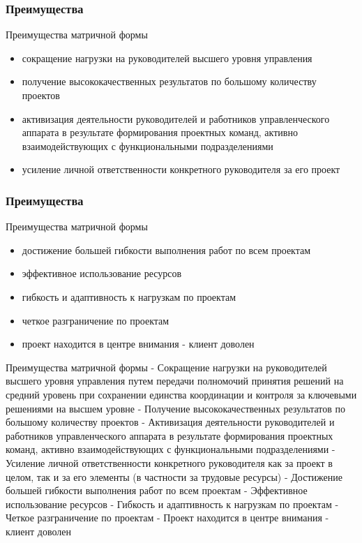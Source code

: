 \documentclass{industrial-development}
\begin{document}
\begin{frame} \frametitle{Преимущества}
  \begin{block}{Преимущества матричной формы}
  \end{block}
  
  \begin{itemize}
  \item сокращение нагрузки на руководителей высшего уровня управления 
  \item получение высококачественных результатов по большому количеству проектов
  \item активизация деятельности руководителей и работников управленческого аппарата в результате формирования проектных команд, активно взаимодействующих с функциональными подразделениями
  \item усиление личной ответственности конкретного руководителя за его проект
  \end{itemize}
\end{frame}

\begin{frame} \frametitle{Преимущества}
  \begin{block}{Преимущества матричной формы}
  \end{block}
  
  \begin{itemize}
 \item достижение большей гибкости выполнения работ по всем проектам
 \item эффективное использование ресурсов
 \item гибкость и адаптивность к нагрузкам по проектам
 \item четкое разграничение по проектам
 \item проект находится в центре внимания - клиент доволен
  \end{itemize}
\end{frame}

\lecturenotes
Преимущества матричной формы
- Сокращение нагрузки на руководителей высшего уровня управления путем передачи полномочий принятия решений на средний уровень при сохранении единства координации и контроля за ключевыми решениями на высшем уровне
- Получение высококачественных результатов по большому количеству проектов
- Активизация деятельности руководителей и работников управленческого аппарата в результате формирования проектных команд, активно взаимодействующих с функциональными подразделениями
- Усиление личной ответственности конкретного руководителя как за проект в целом, так и за его элементы (в частности за трудовые ресурсы)
- Достижение большей гибкости выполнения работ по всем проектам
- Эффективное использование ресурсов
- Гибкость и адаптивность к нагрузкам по проектам
- Четкое разграничение по проектам
- Проект находится в центре внимания - клиент доволен
\end{document}
